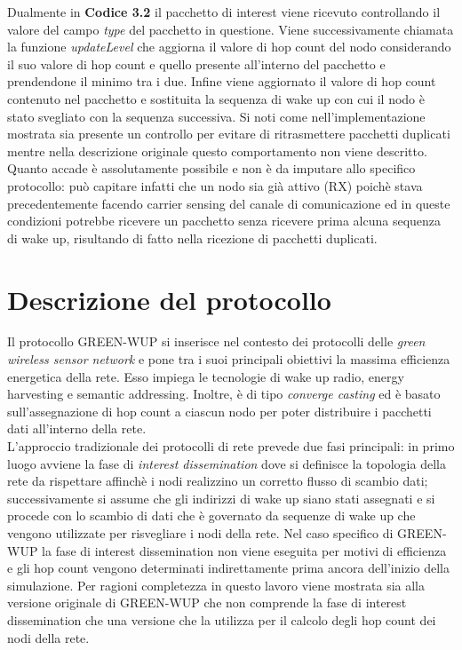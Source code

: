 \documentclass[binding=0.6cm,TFA]{sapthesis}
\begin{document}
Dualmente in \textbf{Codice 3.2} il pacchetto di interest viene ricevuto controllando il valore del campo \emph{type} del pacchetto in questione. Viene
successivamente chiamata la funzione \emph{updateLevel} che aggiorna il valore di hop count del nodo considerando il suo valore di hop count
e quello presente all'interno del pacchetto e prendendone il minimo tra i due. Infine viene aggiornato il valore di hop count contenuto
nel pacchetto e sostituita la sequenza di wake up con cui il nodo è stato svegliato con la sequenza successiva. Si noti come 
nell'implementazione mostrata sia presente un controllo per evitare di ritrasmettere pacchetti duplicati mentre nella descrizione originale
questo comportamento non viene descritto. Quanto accade è assolutamente possibile e non è da imputare allo specifico protocollo: può capitare infatti
che un nodo sia già attivo (RX) poichè stava precedentemente facendo carrier sensing del canale di comunicazione ed in queste condizioni
potrebbe ricevere un pacchetto senza ricevere prima alcuna sequenza di wake up, risultando di fatto nella ricezione di pacchetti duplicati.

\let\cleardoublepage\clearpage  %

\section{Descrizione del protocollo}

Il protocollo GREEN-WUP si inserisce nel contesto dei protocolli delle \emph{green wireless sensor network} e pone tra i suoi principali obiettivi
la massima efficienza energetica della rete. Esso impiega le tecnologie di wake up radio, energy harvesting e semantic addressing. Inoltre, è
di tipo \emph{converge casting} ed è basato sull'assegnazione di hop count a ciascun nodo per poter distribuire i pacchetti dati
all'interno della rete.\\

L'approccio tradizionale dei protocolli di rete prevede due fasi principali: in primo luogo avviene la fase di \emph{interest dissemination} dove si
definisce la topologia della rete da rispettare affinchè i nodi realizzino un corretto flusso di scambio dati; successivamente si assume che gli
indirizzi di wake up siano stati assegnati e si procede con lo scambio di dati che è governato da sequenze di wake up che vengono utilizzate per
risvegliare i nodi della rete. Nel caso specifico di GREEN-WUP la fase di interest dissemination non viene eseguita per motivi di efficienza
e gli hop count vengono determinati indirettamente prima ancora dell'inizio della simulazione. Per ragioni completezza in questo lavoro viene
mostrata sia alla versione originale di GREEN-WUP che non comprende la fase di interest dissemination che una versione che la utilizza per
il calcolo degli hop count dei nodi della rete.\\
\end{document}
